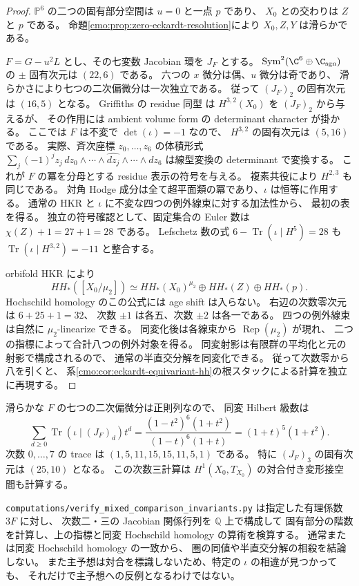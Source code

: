 \begin{proof}
$\mathbb P^6$ の二つの固有部分空間は $u=0$ と一点 $p$ であり、
$X_0$ との交わりは $Z$ と $p$ である。
命題\ref{cmo:prop:zero-eckardt-resolution}により $X_0,Z,Y$ は滑らかである。

$F=G-u^2L$ とし、その七変数 Jacobian 環を $J_F$ とする。
$\operatorname{Sym}^2(\C^6\oplus\C_{\mathrm{sgn}})$ の
$\pm$ 固有次元は $(22,6)$ である。
六つの $x$ 微分は偶、$u$ 微分は奇であり、
滑らかさにより七つの二次偏微分は一次独立である。
従って $(J_F)_2$ の固有次元は $(16,5)$ となる。
Griffiths の residue 同型
\cite[Chapter~1, Theorem~4.21]{CMOHuybrechtsCubics}
は $H^{3,2}(X_0)$ を $(J_F)_2$ から与えるが、
その作用には ambient volume form の determinant character が掛かる。
ここでは $F$ は不変で $\det(\iota)=-1$ なので、
$H^{3,2}$ の固有次元は $(5,16)$ である。
実際、斉次座標 $z_0,\ldots,z_6$ の体積形式
$\sum_j(-1)^jz_j\,dz_0\wedge\cdots\wedge\widehat{dz_j}\wedge\cdots\wedge dz_6$
は線型変換の determinant で変換する。
これが $F$ の冪を分母とする residue 表示の符号を与える。
複素共役により $H^{2,3}$ も同じである。
対角 Hodge 成分は全て超平面類の冪であり、$\iota$ は恒等に作用する。
通常の HKR と $\iota$ に不変な四つの例外線束に対する加法性から、
最初の表を得る。
独立の符号確認として、固定集合の Euler 数は
$\chi(Z)+1=27+1=28$ である。
Lefschetz 数の式
$6-\operatorname{Tr}(\iota\mid H^5)=28$ も
$\operatorname{Tr}(\iota\mid H^{3,2})=-11$ と整合する。

orbifold HKR \cite[Corollary~1.17(2)]{CMOOrbifoldHKR}により
\[
 HH_*([X_0/\mu_2])
 \simeq HH_*(X_0)^{\mu_2}\oplus HH_*(Z)\oplus HH_*(p).
\]
Hochschild homology のこの公式には age shift は入らない。
右辺の次数零次元は $6+25+1=32$、
次数 $\pm1$ は各五、次数 $\pm2$ は各一である。
四つの例外線束は自然に $\mu_2$-linearize できる。
同変化後は各線束から $\operatorname{Rep}(\mu_2)$ が現れ、
二つの指標によって合計八つの例外対象を得る。
同変射影は有限群の平均化と元の射影で構成されるので、
通常の半直交分解を同変化できる。
従って次数零から八を引くと、
系\ref{cmo:cor:eckardt-equivariant-hh}の根スタックによる計算を独立に再現する。

\end{proof}

\begin{remark}
滑らかな $F$ の七つの二次偏微分は正則列なので、
同変 Hilbert 級数は
\[
 \sum_{d\ge0}\operatorname{Tr}(\iota\mid(J_F)_d)t^d
 =
 \frac{(1-t^2)^6(1+t^2)}{(1-t)^6(1+t)}
 =(1+t)^5(1+t^2).
\]
次数 $0,\ldots,7$ の trace は
$(1,5,11,15,15,11,5,1)$ である。
特に $(J_F)_3$ の固有次元は $(25,10)$ となる。
この次数三計算は $H^1(X_0,T_{X_0})$ の対合付き変形接空間も計算する。


\texttt{computations/verify\_mixed\_comparison\_invariants.py} は指定した有理係数 $3F$ に対し、
次数二・三の Jacobian 関係行列を $\mathbb Q$ 上で構成して
固有部分の階数を計算し、上の指標と同変 Hochschild homology の算術を検算する。
通常または同変 Hochschild homology の一致から、
圏の同値や半直交分解の相殺を結論しない。
また主予想は対合を標識しないため、特定の $\iota$ の相違が見つかっても、
それだけで主予想への反例となるわけではない。
\end{remark}

